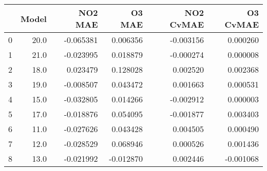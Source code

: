\begin{tabular}{lrrrrr}
\toprule
{} &  Model &   NO2 MAE &    O3 MAE &  NO2 CvMAE &  O3 CvMAE \\
\midrule
0 &   20.0 & -0.065381 &  0.006356 &  -0.003156 &  0.000260 \\
1 &   21.0 & -0.023995 &  0.018879 &  -0.000274 &  0.000008 \\
2 &   18.0 &  0.023479 &  0.128028 &   0.002520 &  0.002368 \\
3 &   19.0 & -0.008507 &  0.043472 &   0.001663 &  0.000531 \\
4 &   15.0 & -0.032805 &  0.014266 &  -0.002912 &  0.000003 \\
5 &   17.0 & -0.018876 &  0.054095 &  -0.001877 &  0.003403 \\
6 &   11.0 & -0.027626 &  0.043428 &   0.004505 &  0.000490 \\
7 &   12.0 & -0.028529 &  0.068946 &   0.000526 &  0.001436 \\
8 &   13.0 & -0.021992 & -0.012870 &   0.002446 & -0.001068 \\
\bottomrule
\end{tabular}
